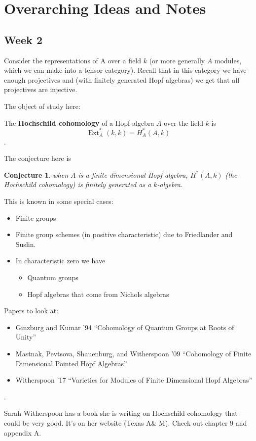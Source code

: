 \documentclass[12pt]{article}
\theoremstyle{nonumberbreak}
\theoremstyle{changebreak}
\newtheorem{conj}[thm]{Conjecture}
\theoremstyle{nonumberplain}
\theoremstyle{change}
\DeclareMathOperator{\Ext}{Ext}
\begin{document}
\section{Overarching Ideas and Notes}
\subsection{Week 2}
Consider the representations of A over a field $k$ (or more generally $A$ modules, which we can make into a tensor category).
Recall that in this category we have enough projectives and (with finitely generated Hopf algebras) we get that all projectives are injective.

The object of study here:
\begin{defn}
	The \textbf{Hochschild cohomology} of a Hopf algebra $A$ over the field $k$ is 
	\[\Ext_A^*(k,k)=H^*_A(A,k)\].
\end{defn}

The conjecture here is
\begin{conj}
	when $A$ is a finite dimensional Hopf algebra, $H^*(A,k)$ (the Hochschild cohomology) 
	is finitely generated as a $k$-algebra.
\end{conj}
This is known in some special cases:
\begin{itemize}
	\item Finite groups
	\item Finite group schemes (in positive characteristic) due to Friedlander and Suslin.
	\item In characteristic zero we have
	\begin{itemize}
		\item Quantum groups
		\item Hopf algebras that come from Nichols algebras
	\end{itemize}
\end{itemize}

Papers to look at:
\begin{itemize}
	\item Ginzburg and Kumar '94 ``Cohomology of Quantum Groups at Roots of Unity'' \cite{ginzburg-kumar}
	\item Mastnak, Pevtsova, Shauenburg, and Witherspoon '09 ``Cohomology of Finite Dimensional Pointed Hopf Algebras''\cite{julia10-pointed}
	\item Witherspoon '17 ``Varieties for Modules of Finite Dimensional Hopf Algebras''\cite{witherspoon-expository}
\end{itemize}. 

Sarah Witherspoon has a book she is writing on Hochschild cohomology that could be very good. It's on her website (Texas A\& M). Check out chapter 9 and appendix A.
\end{document}
